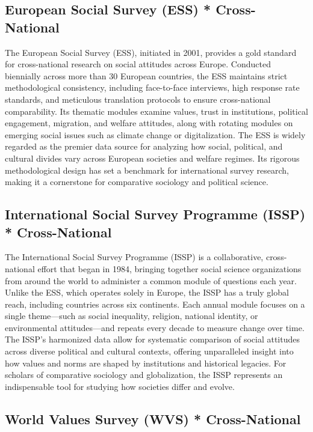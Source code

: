\documentclass[
  letterpaper,
  DIV=11,
  numbers=noendperiod]{scrreprt}
\begin{document}
\subsection{European Social Survey (ESS) *
Cross-National}\label{european-social-survey-ess-cross-national}

The European Social Survey (ESS), initiated in 2001, provides a gold
standard for cross-national research on social attitudes across Europe.
Conducted biennially across more than 30 European countries, the ESS
maintains strict methodological consistency, including face-to-face
interviews, high response rate standards, and meticulous translation
protocols to ensure cross-national comparability. Its thematic modules
examine values, trust in institutions, political engagement, migration,
and welfare attitudes, along with rotating modules on emerging social
issues such as climate change or digitalization. The ESS is widely
regarded as the premier data source for analyzing how social, political,
and cultural divides vary across European societies and welfare regimes.
Its rigorous methodological design has set a benchmark for international
survey research, making it a cornerstone for comparative sociology and
political science.

\subsection{International Social Survey Programme (ISSP) *
Cross-National}\label{international-social-survey-programme-issp-cross-national}

The International Social Survey Programme (ISSP) is a collaborative,
cross-national effort that began in 1984, bringing together social
science organizations from around the world to administer a common
module of questions each year. Unlike the ESS, which operates solely in
Europe, the ISSP has a truly global reach, including countries across
six continents. Each annual module focuses on a single theme---such as
social inequality, religion, national identity, or environmental
attitudes---and repeats every decade to measure change over time. The
ISSP's harmonized data allow for systematic comparison of social
attitudes across diverse political and cultural contexts, offering
unparalleled insight into how values and norms are shaped by
institutions and historical legacies. For scholars of comparative
sociology and globalization, the ISSP represents an indispensable tool
for studying how societies differ and evolve.

\subsection{World Values Survey (WVS) *
Cross-National}\label{world-values-survey-wvs-cross-national}
\end{document}
